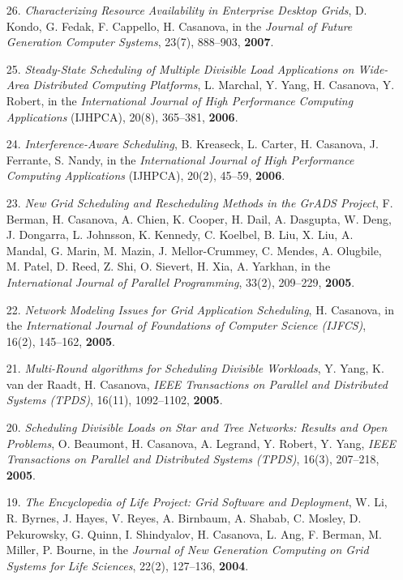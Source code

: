\begin{enumerate}
\item[26.] {\it Characterizing Resource Availability in Enterprise Desktop
Grids}, D. Kondo, G. Fedak, F. Cappello, H. Casanova, in the \emph{Journal
of Future Generation Computer Systems}, 23(7), 888--903, {\bf 2007}.

\item[25.] {\it Steady-State Scheduling of Multiple Divisible Load
Applications on Wide-Area Distributed Computing Platforms}, L. Marchal, Y.
Yang, H. Casanova, Y. Robert, in the \emph{International Journal
of High Performance Computing Applications} (IJHPCA), 20(8), 365--381,
{\bf 2006}.

\item [24.] {\it Interference-Aware Scheduling}, B. Kreaseck,
L. Carter, H. Casanova, J. Ferrante, S. Nandy, 
in the \emph{International Journal of High Performance Computing
Applications} (IJHPCA), 20(2), 45--59, {\bf 2006}.

\item [23.]
{\it New Grid Scheduling and Rescheduling Methods in the GrADS Project},
F. Berman, H. Casanova, A. Chien, K. Cooper, H. Dail, A. Dasgupta, W. Deng, J. Dongarra, L. Johnsson, K. Kennedy, C. Koelbel, B. Liu, X. Liu, A. Mandal, G. Marin, M. Mazin, J. Mellor-Crummey, C. Mendes, A. Olugbile, M. Patel, D. Reed, Z. Shi, O. Sievert, H. Xia, A. Yarkhan, in the \emph{International Journal of Parallel Programming}, 33(2), 209--229, {\bf 2005}. 

\item [22.]
{\it Network Modeling Issues for Grid Application Scheduling}, 
H. Casanova, in the \emph{International Journal of 
Foundations of Computer Science (IJFCS)}, 16(2), 145--162, {\bf 2005}.

\item [21.] 
{\it Multi-Round algorithms for Scheduling Divisible Workloads},
Y. Yang, K. van der Raadt, H. Casanova, \emph{IEEE Transactions on
Parallel and Distributed Systems (TPDS)}, 16(11), 1092--1102, {\bf 2005}.

\item [20.]
{\it Scheduling Divisible Loads on Star and Tree Networks: Results
and Open Problems}, O. Beaumont, H. Casanova, A. Legrand, Y. Robert,
Y. Yang, \emph{IEEE Transactions on Parallel and Distributed
Systems (TPDS)}, 16(3), 207--218, {\bf 2005}.

\item [19.]
{\it The Encyclopedia of Life Project: Grid Software and Deployment},
W. Li, R. Byrnes, J. Hayes, V. Reyes, A. Birnbaum, A. Shabab, C. Mosley,
D. Pekurowsky, G. Quinn, I. Shindyalov, H. Casanova, L. Ang, F. Berman,
M. Miller, P. Bourne, in the \emph{Journal of New Generation Computing
on Grid Systems for Life Sciences}, 22(2), 127--136, {\bf 2004}.


\end{enumerate}
